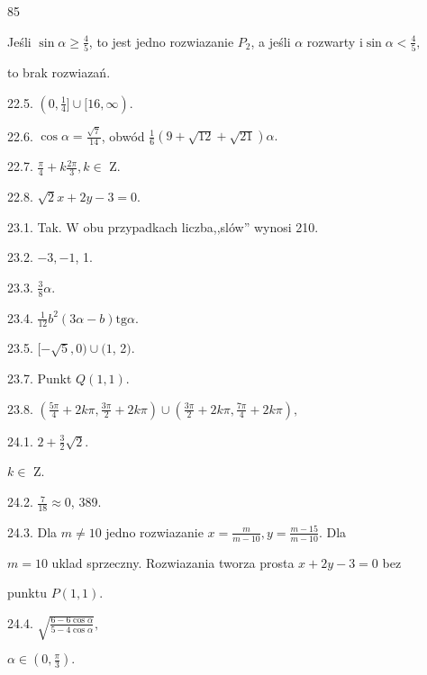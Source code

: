 \documentclass[a4paper,12pt]{article}
\begin{document}
85

Jeśli $\displaystyle \sin\alpha\geq\frac{4}{5}$, to jest jedno rozwiazanie $P_{2}$, a jeśli $\alpha$ rozwarty $\displaystyle \mathrm{i}\sin\alpha<\frac{4}{5},$

to brak rozwiazań.

22.5. $(0,\displaystyle \frac{1}{4}]\cup[16,\infty).$

22.6. $\displaystyle \cos\alpha=\frac{\sqrt{7}}{14}$, obwód $\displaystyle \frac{1}{6}(9+\sqrt{12}+\sqrt{21})\alpha.$

22.7. $\displaystyle \frac{\pi}{4}+k\frac{2\pi}{3},  k\in$ Z.

22.8. $\sqrt{2}x+2y-3=0.$

23.1. Tak. $\mathrm{W}$ obu przypadkach liczba,,slów'' wynosi 210.

23.2. $-3, -1$, 1.

23.3. $\displaystyle \frac{3}{8}\alpha.$

23.4. $\displaystyle \frac{1}{12}b^{2}(3\alpha-b)\mathrm{t}\mathrm{g}\alpha.$

23.5. $[-\sqrt{5},0)\cup(1$, 2$).$

23.7. Punkt $Q(1,1).$

23.8. $(\displaystyle \frac{5\pi}{4}+2k\pi,\frac{3\pi}{2}+2k\pi)\cup(\frac{3\pi}{2}+2k\pi,\frac{7\pi}{4}+2k\pi),$

24.1. $2+\displaystyle \frac{3}{2}\sqrt{2}.$

$ k\in$ Z.

24.2. $\displaystyle \frac{7}{18}\approx 0$, 389.

24.3. Dla $ m\neq 10$ jedno rozwiazanie $x= \displaystyle \frac{m}{m-10}, y= \displaystyle \frac{m-15}{m-10}$. Dla

$m= 10$ uklad sprzeczny. Rozwiazania tworza prosta $x+2y-3=0$ bez

punktu $P(1,1).$

24.4. $\sqrt{\frac{6-6\cos\alpha}{5-4\cos\alpha}},$

$\alpha\in (0,\displaystyle \frac{\pi}{3}).$
\end{document}
